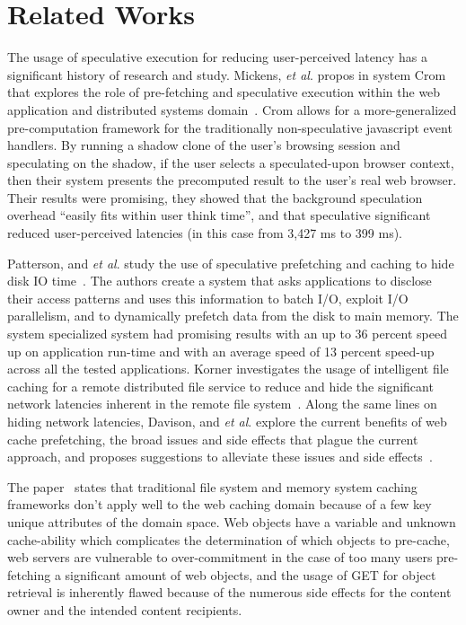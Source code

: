 \section{Related Works}
\label{sec:related}
The usage of speculative execution for reducing user-perceived latency has a
significant history of research and study. 
Mickens, {\it et al}. propos in system Crom that 
explores the role of pre-fetching and speculative execution within the web
application and distributed systems domain~\cite{crom}. Crom allows for a
more-generalized pre-computation framework for the traditionally non-speculative
javascript event handlers. By running a shadow clone of the user's browsing
session and speculating on the shadow, if the user selects a speculated-upon
browser context, then their system presents the precomputed result to the user's
real web browser. Their results were promising, they showed that the background
speculation overhead ``easily fits within user think time'', and that  speculative
significant reduced user-perceived latencies (in this case from 3,427 ms to 399
ms).

Patterson, and {\it et al}. study the use of speculative prefetching and caching
to hide disk IO time~\cite{diskio}.  The authors create a system that asks
applications to disclose their access patterns and uses this information to
batch I/O, exploit I/O parallelism, and to dynamically prefetch data from the
disk to main memory. The system specialized system had promising results with an
up to 36 percent speed up on application run-time and with an average speed of
13 percent speed-up across all the tested applications. 
Korner investigates the usage of intelligent file caching for a
remote distributed file service to reduce and hide the significant network
latencies inherent in the remote file system~\cite{korner}.
Along the same lines on hiding network latencies, Davison, and {\it et al}. explore
the current benefits of web cache prefetching, the broad issues and side effects
that plague the current approach, and proposes suggestions to alleviate these
issues and side effects~\cite{davison}.

The paper~\cite{davison} states that traditional file system and memory system
caching frameworks don't apply well to the web caching domain because of a few
key unique attributes of the domain space. Web objects have a variable and
unknown cache-ability which complicates the determination of which objects to
pre-cache, web servers are vulnerable to over-commitment in the case of too many
users pre-fetching a significant amount of web objects, and the usage of GET for
object retrieval is inherently flawed because of the numerous side effects for
the content owner and the intended content recipients.

